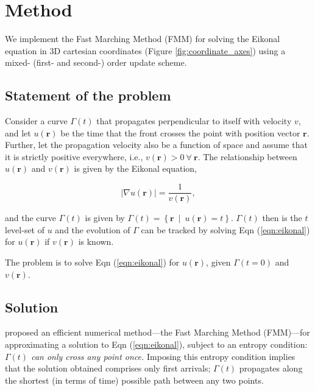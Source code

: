 \section{Method}
	We implement the Fast Marching Method (FMM) for solving the Eikonal equation in 3D cartesian coordinates (Figure \ref{fig:coordinate_axes}) using a mixed- (first- and second-) order update scheme.
	\par
	
	

	\subsection{Statement of the problem}
		Consider a curve $\Gamma\left(t\right)$ that propagates perpendicular to itself with velocity $v$, and let $u\left(\mathbf{r}\right)$ be the time that the front crosses the point with position vector $\mathbf{r}$. Further, let the propagation velocity also be a function of space and assume that it is strictly positive everywhere, i.e., $v\left(\mathbf{r}\right) > 0 \ \forall\ \mathbf{r}$. The relationship between $u\left(\mathbf{r}\right)$ and $v\left(\mathbf{r}\right)$ is given by the Eikonal equation,
		
		\begin{equation}
			\label{eqn:eikonal}
			\left|\nabla u\left(\mathbf{r}\right)\right| = \frac{1}{v\left(\mathbf{r}\right)},
		\end{equation}
		
		\noindent and the curve $\Gamma\left(t\right)$ is given by $\Gamma\left(t\right) = \left\{\mathbf{r}\ \mid\ u\left(\mathbf{r}\right) = t\right\}$. $\Gamma\left(t\right)$ then is the $t$ level-set of $u$ and the evolution of $\Gamma$ can be tracked by solving Eqn (\ref{eqn:eikonal}) for $u\left(\mathbf{r}\right)$ if $v\left(\mathbf{r}\right)$ is known.
		\par
		
		The problem is to solve Eqn (\ref{eqn:eikonal}) for $u\left(\mathbf{r}\right)$, given $\Gamma\left(t=0\right)$ and $v\left(\mathbf{r}\right)$.
	
	\subsection{Solution}
		 proposed an efficient numerical method---the Fast Marching Method (FMM)---for approximating a solution to Eqn (\ref{eqn:eikonal}), subject to an entropy condition: \textit{$\Gamma\left(t\right)$ can only cross any point once.} Imposing this entropy condition implies that the solution obtained comprises only first arrivals; $\Gamma\left(t\right)$ propagates along the shortest (in terms of time) possible path between any two points.
		\par
		

